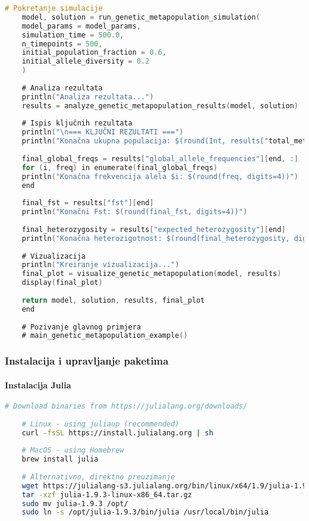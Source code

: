 \documentclass[11pt,oneside]{book}
\begin{document}
\begin{lstlisting}[language=C, caption=Julia implementacija genetski strukturiranog metapopulacijskog modela]
	# Pokretanje simulacije
	model, solution = run_genetic_metapopulation_simulation(
	model_params = model_params,
	simulation_time = 500.0,
	n_timepoints = 500,
	initial_population_fraction = 0.6,
	initial_allele_diversity = 0.2
	)
	
	# Analiza rezultata
	println("Analiza rezultata...")
	results = analyze_genetic_metapopulation_results(model, solution)
	
	# Ispis ključnih rezultata
	println("\n=== KLJUČNI REZULTATI ===")
	println("Konačna ukupna populacija: $(round(Int, results["total_metapopulation"][end]))")
	
	final_global_freqs = results["global_allele_frequencies"][end, :]
	for (i, freq) in enumerate(final_global_freqs)
	println("Konačna frekvencija alela $i: $(round(freq, digits=4))")
	end
	
	final_fst = results["fst"][end]
	println("Konačni Fst: $(round(final_fst, digits=4))")
	
	final_heterozygosity = results["expected_heterozygosity"][end]
	println("Konačna heterozigotnost: $(round(final_heterozygosity, digits=4))")
	
	# Vizualizacija
	println("Kreiranje vizualizacija...")
	final_plot = visualize_genetic_metapopulation(model, results)
	display(final_plot)
	
	return model, solution, results, final_plot
	end
	
	# Pozivanje glavnog primjera
	# main_genetic_metapopulation_example()
\end{lstlisting}

\subsubsection{Instalacija i upravljanje paketima}

\paragraph{Instalacija Julia}

\begin{lstlisting}[language=bash, caption=Instalacija Julia]
	# Download binaries from https://julialang.org/downloads/
	
	# Linux - using juliaup (recommended)
	curl -fsSL https://install.julialang.org | sh
	
	# MacOS - using Homebrew
	brew install julia
	
	# Alternativno, direktno preuzimanje
	wget https://julialang-s3.julialang.org/bin/linux/x64/1.9/julia-1.9.3-linux-x86_64.tar.gz
	tar -xzf julia-1.9.3-linux-x86_64.tar.gz
	sudo mv julia-1.9.3 /opt/
	sudo ln -s /opt/julia-1.9.3/bin/julia /usr/local/bin/julia
\end{lstlisting}
\end{document}

